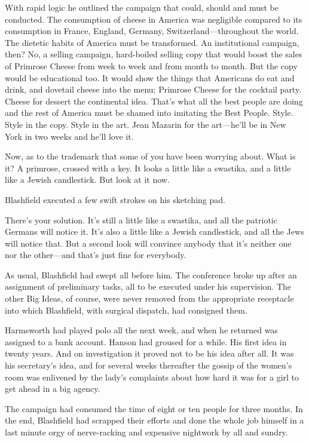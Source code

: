 \documentclass[twoside,nohyper,openany,nobib]{tufte-book}
\begin{document}
With rapid logic he outlined the campaign that could, should and must be
conducted. The consumption of cheese in America was negligible compared
to its consumption in France, England, Germany, Switzerland---throughout
the world. The dietetic habits of America must be transformed. An
institutional campaign, then? No, a selling campaign, hard-boiled
selling copy that would boost the sales of Primrose Cheese from week to
week and from month to month. But the copy would be educational too. It
would show the things that Americans do eat and drink, and dovetail
cheese into the menu; Primrose Cheese for the cocktail party. Cheese for
dessert the continental idea. That's what all the best people are doing
and the rest of America must be shamed into imitating the Best People.
Style. Style in the copy. Style in the art. Jean Mazarin for the
art---he'll be in New York in two weeks and he'll love it.

Now, as to the trademark that some of you have been worrying about. What
is it? A primrose, crossed with a key. It looks a little like a
swastika, and a little like a Jewish candlestick. But look at it now.

Blashfield executed a few swift strokes on his sketching pad.

There's your solution. It's still a little like a swastika, and all the
patriotic Germans will notice it. It's also a little like a Jewish
candlestick, and all the Jews will notice that. But a second look will
convince anybody that it's neither one nor the other---and that's just
fine for everybody.

As usual, Blashfield had swept all before him. The conference broke up
after an assignment of preliminary tasks, all to be executed under his
supervision. The other Big Ideas, of course, were never removed from the
appropriate receptacle into which Blashfield, with surgical dispatch,
had consigned them.

Harmsworth had played polo all the next week, and when he returned was
assigned to a bank account. Hanson had groused for a while. His first
idea in twenty years. And on investigation it proved not to be his idea
after all. It was his secretary's idea, and for several weeks thereafter
the gossip of the women's room was enlivened by the lady's complaints
about how hard it was for a girl to get ahead in a big agency.

The campaign had consumed the time of eight or ten people for three
months. In the end, Blashfield had scrapped their efforts and done the
whole job himself in a last minute orgy of nerve-racking and expensive
nightwork by all and sundry.
\end{document}
